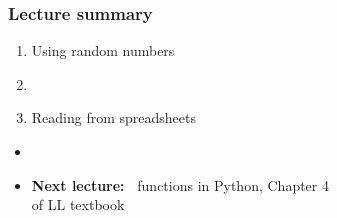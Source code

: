 \documentclass[english,14pt]{beamer}
\begin{document}

\begin{frame}[fragile]

\frametitle{Lecture summary}
\begin{enumerate}
	\item Using random numbers
	\item[]
	
	\item Reading from spreadsheets
\end{enumerate}

\begin{itemize}
	\item[]
	\item \textbf{Next lecture:~} functions in Python, Chapter 4 \\ of LL textbook
\end{itemize}

\end{frame}
\end{document}
